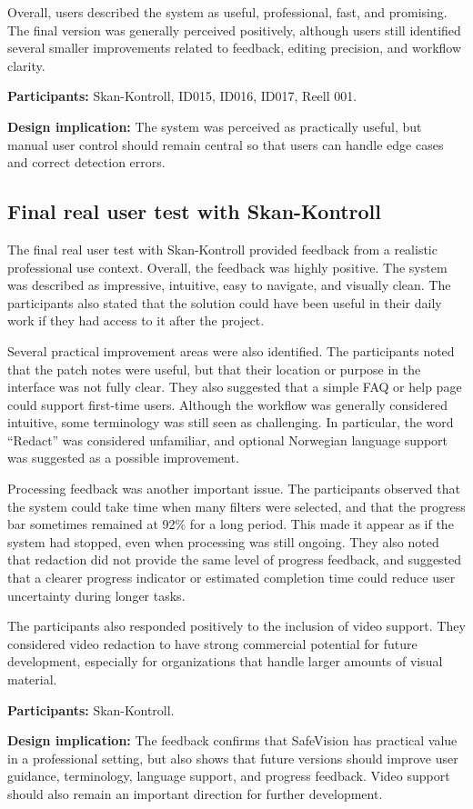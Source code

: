 Overall, users described the system as useful, professional, fast, and promising.
The final version was generally perceived positively, although users still
identified several smaller improvements related to feedback, editing precision,
and workflow clarity.

\textbf{Participants:} Skan-Kontroll, ID015, ID016, ID017, Reell 001.

\textbf{Design implication:} The system was perceived as practically useful, but
manual user control should remain central so that users can handle edge cases
and correct detection errors.

\subsection*{Final real user test with Skan-Kontroll}
\label{appsec:finale_real_test}

The final real user test with Skan-Kontroll provided feedback from a realistic professional use context. Overall, the feedback was highly positive. The system was described as impressive, intuitive, easy to navigate, and visually clean. The participants also stated that the solution could have been useful in their daily work if they had access to it after the project.

Several practical improvement areas were also identified. The participants noted that the patch notes were useful, but that their location or purpose in the interface was not fully clear. They also suggested that a simple FAQ or help page could support first-time users. Although the workflow was generally considered intuitive, some terminology was still seen as challenging. In particular, the word ``Redact'' was considered unfamiliar, and optional Norwegian language support was suggested as a possible improvement.

Processing feedback was another important issue. The participants observed that the system could take time when many filters were selected, and that the progress bar sometimes remained at 92\% for a long period. This made it appear as if the system had stopped, even when processing was still ongoing. They also noted that redaction did not provide the same level of progress feedback, and suggested that a clearer progress indicator or estimated completion time could reduce user uncertainty during longer tasks.

The participants also responded positively to the inclusion of video support. They considered video redaction to have strong commercial potential for future development, especially for organizations that handle larger amounts of visual material.

\textbf{Participants:} Skan-Kontroll.

\textbf{Design implication:} The feedback confirms that SafeVision has practical value in a professional setting, but also shows that future versions should improve user guidance, terminology, language support, and progress feedback. Video support should also remain an important direction for further development.